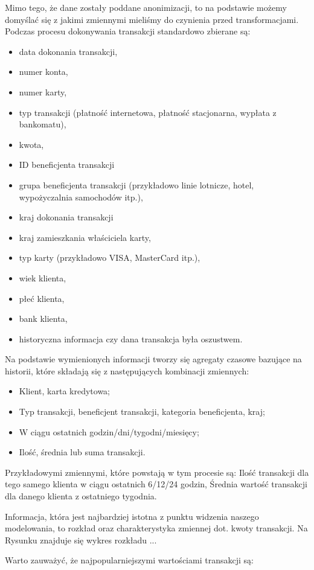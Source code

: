\documentclass[inzynierska]{pwr_wmat_praca_dyplomowa}
\theoremstyle{plain}
\numberwithin{theorem}{chapter}
\theoremstyle{definition}
\numberwithin{theorem}{chapter}
\begin{document}
Mimo tego, że dane zostały poddane anonimizacji, to na podstawie \cite{CSCCFD} możemy domyślać się z jakimi zmiennymi mieliśmy do czynienia przed transformacjami. Podczas procesu dokonywania transakcji standardowo zbierane są: 
\begin{itemize}
	\item data dokonania transakcji, 
	\item numer konta,
	\item numer karty,
	\item typ transakcji (płatność internetowa, płatność stacjonarna, wypłata z bankomatu),
	\item kwota, 
	\item ID beneficjenta transakcji
	\item grupa beneficjenta transakcji (przykładowo linie lotnicze, hotel, wypożyczalnia samochodów itp.), 
	\item kraj dokonania transakcji
	\item kraj zamieszkania właściciela karty,
	\item typ karty (przykładowo VISA, MasterCard itp.),
	\item wiek klienta, 
 	\item płeć klienta,
	\item bank klienta,
	\item historyczna informacja czy dana transakcja była oszustwem.
\end{itemize}
Na podstawie wymienionych informacji tworzy się agregaty czasowe bazujące na historii, które składają się z następujących kombinacji zmiennych:
\begin{itemize}
	\item Klient, karta kredytowa;
	\item Typ transakcji, beneficjent transakcji, kategoria beneficjenta, kraj;
	\item W ciągu ostatnich godzin/dni/tygodni/miesięcy;
	\item Ilość, średnia lub suma transakcji.
\end{itemize}
Przykładowymi zmiennymi, które powstają w tym procesie są: Ilość transakcji dla tego samego klienta w ciągu ostatnich 6/12/24 godzin, Średnia wartość transakcji dla danego klienta z ostatniego tygodnia. 

Informacja, która jest najbardziej istotna z punktu widzenia naszego modelowania, to rozkład oraz charakterystyka zmiennej dot. kwoty transakcji. Na Rysunku znajduje się wykres rozkładu ... 

Warto zauważyć, że najpopularniejszymi wartościami transakcji są: 
\end{document}
